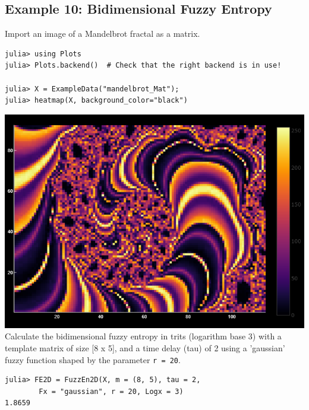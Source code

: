 \documentclass[12pt, a4paper, titlepage, openany]{book}
\begin{document}
\subsection{\normalsize Example 10: \hspace{15mm} Bidimensional Fuzzy Entropy}
\noindent Import an image of a Mandelbrot fractal as a matrix.
\begin{verbatim}
julia> using Plots
julia> Plots.backend()  # Check that the right backend is in use! 

julia> X = ExampleData("mandelbrot_Mat");
julia> heatmap(X, background_color="black")
\end{verbatim}
\includegraphics[scale=.5]{mandelbrotjl.png}\newline \newline
Calculate the bidimensional fuzzy entropy in trits (logarithm base 3) with a template matrix of size [8 x 5], and a time delay (tau) of 2  using a 'gaussian' fuzzy function shaped by the parameter \texttt{r = 20}.
\begin{verbatim}
julia> FE2D = FuzzEn2D(X, m = (8, 5), tau = 2, 
		Fx = "gaussian", r = 20, Logx = 3)
1.8659
\end{verbatim}




\newpage
\end{document}
